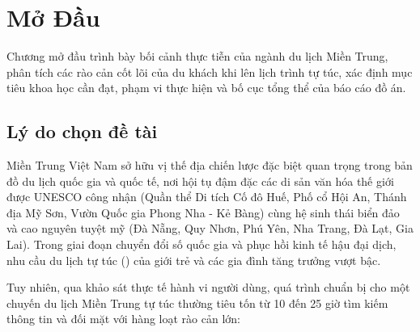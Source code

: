 \chapter{Mở Đầu}

\begin{muctieu}
Chương mở đầu trình bày bối cảnh thực tiễn của ngành du lịch Miền Trung, phân tích các rào cản cốt lõi của du khách khi lên lịch trình tự túc, xác định mục tiêu khoa học cần đạt, phạm vi thực hiện và bố cục tổng thể của báo cáo đồ án.
\end{muctieu}

\section{Lý do chọn đề tài}

Miền Trung Việt Nam sở hữu vị thế địa chiến lược đặc biệt quan trọng trong bản đồ du lịch quốc gia và quốc tế, nơi hội tụ đậm đặc các di sản văn hóa thế giới được UNESCO công nhận (Quần thể Di tích Cố đô Huế, Phố cổ Hội An, Thánh địa Mỹ Sơn, Vườn Quốc gia Phong Nha - Kẻ Bàng) cùng hệ sinh thái biển đảo và cao nguyên tuyệt mỹ (Đà Nẵng, Quy Nhơn, Phú Yên, Nha Trang, Đà Lạt, Gia Lai). Trong giai đoạn chuyển đổi số quốc gia và phục hồi kinh tế hậu đại dịch, nhu cầu du lịch tự túc () của giới trẻ và các gia đình tăng trưởng vượt bậc.

Tuy nhiên, qua khảo sát thực tế hành vi người dùng, quá trình chuẩn bị cho một chuyến du lịch Miền Trung tự túc thường tiêu tốn từ 10 đến 25 giờ tìm kiếm thông tin và đối mặt với hàng loạt rào cản lớn:

